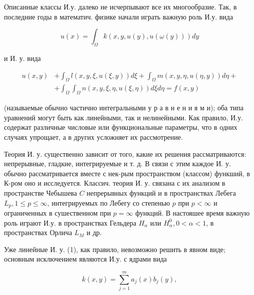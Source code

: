 \documentclass[10pt]{article}
\begin{document}
Описанные классы И.у. далеко не исчерпывают все их многообразие. Так, в последние годы в математич. физике начали играть важную роль И.у. вида



\[

u(x)=\int_{\Omega} k(x, y, u(y), u(\omega(y))) d y

\]



и И. у. вида



\[

\begin{aligned}

u(x, y) & +\int_{\Omega} l(x, y, \xi, u(\xi, y)) d \xi+\int_{\Omega} m(x, y, \eta, u(\eta, y)) d \eta+ \\

& +\int_{\Omega} \int_{\Omega} n(x, y, \xi, \eta, u(\xi, \eta)) d \xi d \eta=f(x, y)

\end{aligned}

\]



(называемые обычно частично интегральными у р а в н е н и я м и); оба типа уравнений могут быть как линейными, так и нелинейными. Как правило, И.у. содержат различные числовые или функциональные параметры, что в одних случаях упрощает, а в других усложняет их рассмотрение.



Теория И. у. существенно зависит от того, какие их решения рассматриваются: непрерывные, гладкие, интегрируемые и т. д. В связи с этим каждое И. у. обычно рассматривается вместе с нек-рым пространством (классом) функший, в К-ром оно и исследуется. Классич. теория И. у. связана с их анализом в пространстве Чебышева $C$ непрерывных функций и в пространствах Лебега $L_{p}, 1 \leqslant p \leqslant \infty$, интегрируемых по Лебегу со степенью $p$ при $p<\infty$ и ограниченных в сушественном при $p=\infty$ функций. В настояшее время важную роль играют И.у. в пространствах Гельдера $H_{\alpha}$ или $H_{\alpha}^{0}, 0<\alpha<1$, в пространствах Орлича $L_{M}$ и др.



Уже линейные И. у. (1), как правило, невозможно решить в явном виде; основным исключением являются И.у. с ядрами вида



\[

k(x, y)=\sum_{j=1}^{m} a_{j}(x) b_{j}(y),

\]
\end{document}
